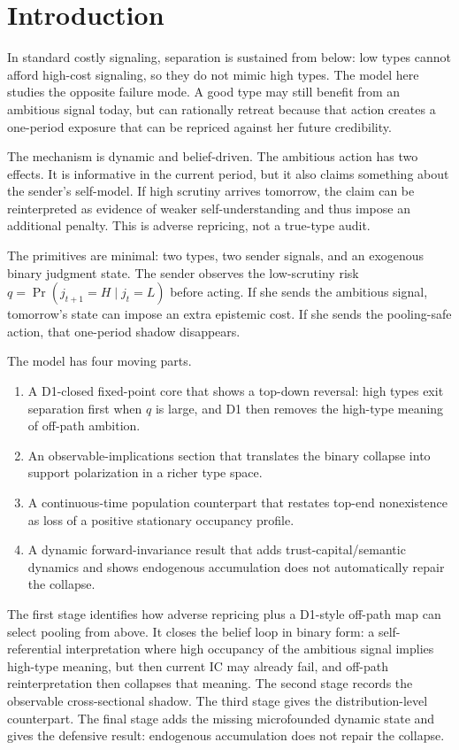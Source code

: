 
\section{Introduction}
\label{sec:introduction}

In standard costly signaling, separation is sustained from below: low types cannot afford high-cost signaling, so they do not mimic high types. The model here studies the opposite failure mode. A good type may still benefit from an ambitious signal today, but can rationally retreat because that action creates a one-period exposure that can be repriced against her future credibility.

The mechanism is dynamic and belief-driven. The ambitious action has two effects. It is informative in the current period, but it also claims something about the sender’s self-model. If high scrutiny arrives tomorrow, the claim can be reinterpreted as evidence of weaker self-understanding and thus impose an additional penalty. This is adverse repricing, not a true-type audit.

The primitives are minimal: two types, two sender signals, and an exogenous binary judgment state. The sender observes the low-scrutiny risk $q=\Pr(j_{t+1}=H\mid j_t=L)$ before acting. If she sends the ambitious signal, tomorrow’s state can impose an extra epistemic cost. If she sends the pooling-safe action, that one-period shadow disappears.

The model has four moving parts.
\begin{enumerate}
\item A D1-closed fixed-point core that shows a top-down reversal: high types exit separation first when $q$ is large, and D1 then removes the high-type meaning of off-path ambition.
\item An observable-implications section that translates the binary collapse into support polarization in a richer type space.
\item A continuous-time population counterpart that restates top-end nonexistence as loss of a positive stationary occupancy profile.
\item A dynamic forward-invariance result that adds trust-capital/semantic dynamics and shows endogenous accumulation does not automatically repair the collapse.
\end{enumerate}

The first stage identifies how adverse repricing plus a D1-style off-path map can select pooling from above. It closes the belief loop in binary form: a self-referential interpretation where high occupancy of the ambitious signal implies high-type meaning, but then current IC may already fail, and off-path reinterpretation then collapses that meaning. The second stage records the observable cross-sectional shadow. The third stage gives the distribution-level counterpart. The final stage adds the missing microfounded dynamic state and gives the defensive result: endogenous accumulation does not repair the collapse.

